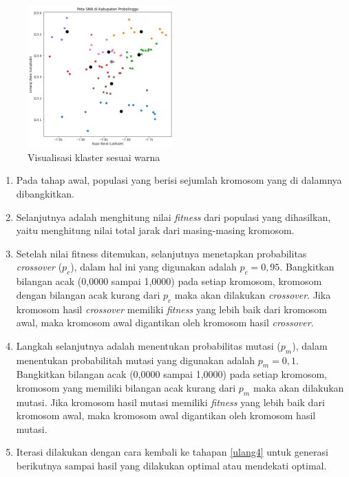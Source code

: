 \begin{figure}[H]
	\centering
	\includegraphics[width=0.5\textwidth]{Gambar/hasil klaster.png}
	\caption{Visualisasi klaster sesuai warna}
	\label{fig:hasilklas}
\end{figure}

\begin{enumerate}
	\item Pada tahap awal, populasi yang berisi sejumlah kromosom yang di dalamnya dibangkitkan.
	\item \label{ulang4} Selanjutnya adalah menghitung nilai \textit{fitness} dari populasi yang dihasilkan, yaitu menghitung nilai total jarak dari masing-masing kromosom.
	\item Setelah nilai fitness ditemukan, selanjutnya menetapkan probabilitas \textit{crossover} ($p_c$), dalam hal ini yang digunakan adalah $p_c=0,95$. Bangkitkan bilangan acak (0,0000 sampai 1,0000) pada setiap kromosom, kromosom dengan bilangan acak kurang dari $p_c$ maka akan dilakukan \textit{crossover}. Jika kromosom hasil \textit{crossover} memiliki \textit{fitness} yang lebih baik  dari kromosom awal, maka kromosom awal digantikan oleh kromosom hasil \textit{crossover}.
	\item Langkah selanjutnya adalah menentukan probabilitas mutasi ($p_m$), dalam menentukan probabilitah mutasi yang digunakan adalah $p_m=0,1$. Bangkitkan bilangan acak (0,0000 sampai 1,0000) pada setiap kromosom, kromosom yang memiliki bilangan acak kurang dari $p_m$ maka akan dilakukan mutasi. Jika kromosom hasil mutasi memiliki \textit{fitness} yang lebih baik dari kromosom awal, maka kromosom awal digantikan oleh kromosom hasil mutasi.
	\item Iterasi dilakukan dengan cara kembali ke tahapan \ref{ulang4} untuk generasi berikutnya sampai hasil yang dilakukan optimal atau mendekati optimal.
\end{enumerate}

